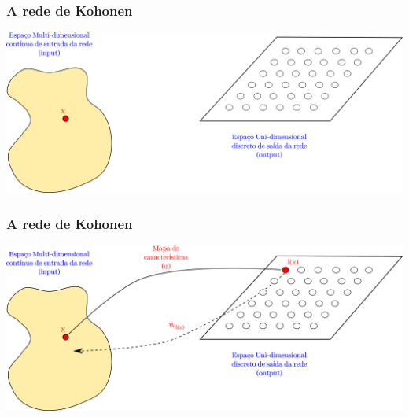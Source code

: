 \documentclass[10pt]{beamer} %
\begin{document}
\begin{frame}
	\frametitle{A rede de Kohonen}
	\includegraphics[scale=0.5]{Imagens/IntroKoho3.png} 
	
\end{frame}

\begin{frame}
	\frametitle{A rede de Kohonen}
	\includegraphics[scale=0.5]{Imagens/IntroKoho4.png} 
	
\end{frame}
\end{document}
